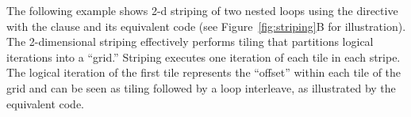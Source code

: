 
The following example shows 2-d striping of two nested loops using
the  directive with the  clause 
and its equivalent code
(see Figure~\ref{fig:striping}B for illustration).
The 2-dimensional striping effectively performs
tiling that partitions logical iterations into a ``grid.''
Striping executes one iteration of each tile in each stripe.
The logical iteration of the first tile represents the ``offset'' 
within each tile of the grid and can be seen as tiling followed by
a loop interleave, as illustrated by the equivalent code.


